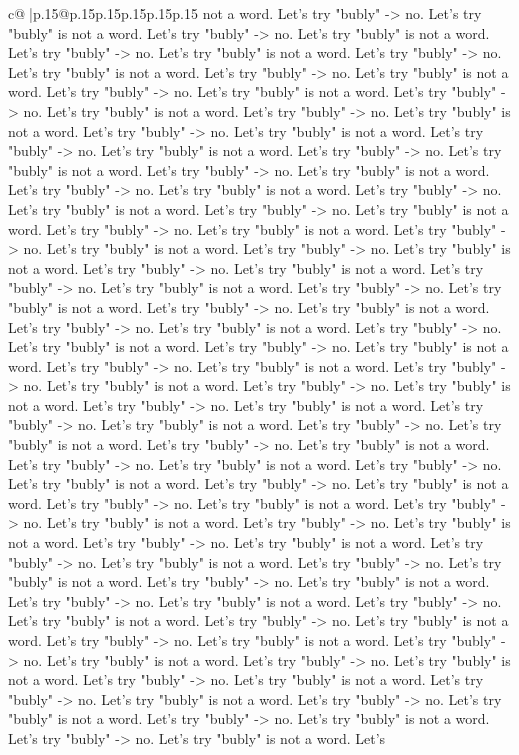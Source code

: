 \documentclass{article}
\begin{document}
{\begin{supertabular}{c@{$\;$}|p{.15\linewidth}@{}p{.15\linewidth}p{.15\linewidth}p{.15\linewidth}p{.15\linewidth}p{.15\linewidth}}
{{{not a word. Let's try "bubly" {-}> no. Let's try "bubly" is not a word. Let's try "bubly" {-}> no. Let's try "bubly" is not a word. Let's try "bubly" {-}> no. Let's try "bubly" is not a word. Let's try "bubly" {-}> no. Let's try "bubly" is not a word. Let's try "bubly" {-}> no. Let's try "bubly" is not a word. Let's try "bubly" {-}> no. Let's try "bubly" is not a word. Let's try "bubly" {-}> no. Let's try "bubly" is not a word. Let's try "bubly" {-}> no. Let's try "bubly" is not a word. Let's try "bubly" {-}> no. Let's try "bubly" is not a word. Let's try "bubly" {-}> no. Let's try "bubly" is not a word. Let's try "bubly" {-}> no. Let's try "bubly" is not a word. Let's try "bubly" {-}> no. Let's try "bubly" is not a word. Let's try "bubly" {-}> no. Let's try "bubly" is not a word. Let's try "bubly" {-}> no. Let's try "bubly" is not a word. Let's try "bubly" {-}> no. Let's try "bubly" is not a word. Let's try "bubly" {-}> no. Let's try "bubly" is not a word. Let's try "bubly" {-}> no. Let's try "bubly" is not a word. Let's try "bubly" {-}> no. Let's try "bubly" is not a word. Let's try "bubly" {-}> no. Let's try "bubly" is not a word. Let's try "bubly" {-}> no. Let's try "bubly" is not a word. Let's try "bubly" {-}> no. Let's try "bubly" is not a word. Let's try "bubly" {-}> no. Let's try "bubly" is not a word. Let's try "bubly" {-}> no. Let's try "bubly" is not a word. Let's try "bubly" {-}> no. Let's try "bubly" is not a word. Let's try "bubly" {-}> no. Let's try "bubly" is not a word. Let's try "bubly" {-}> no. Let's try "bubly" is not a word. Let's try "bubly" {-}> no. Let's try "bubly" is not a word. Let's try "bubly" {-}> no. Let's try "bubly" is not a word. Let's try "bubly" {-}> no. Let's try "bubly" is not a word. Let's try "bubly" {-}> no. Let's try "bubly" is not a word. Let's try "bubly" {-}> no. Let's try "bubly" is not a word. Let's try "bubly" {-}> no. Let's try "bubly" is not a word. Let's try "bubly" {-}> no. Let's try "bubly" is not a word. Let's try "bubly" {-}> no. Let's try "bubly" is not a word. Let's try "bubly" {-}> no. Let's try "bubly" is not a word. Let's try "bubly" {-}> no. Let's try "bubly" is not a word. Let's try "bubly" {-}> no. Let's try "bubly" is not a word. Let's try "bubly" {-}> no. Let's try "bubly" is not a word. Let's try "bubly" {-}> no. Let's try "bubly" is not a word. Let's try "bubly" {-}> no. Let's try "bubly" is not a word. Let's try "bubly" {-}> no. Let's try "bubly" is not a word. Let's try "bubly" {-}> no. Let's try "bubly" is not a word. Let's try "bubly" {-}> no. Let's try "bubly" is not a word. Let's try "bubly" {-}> no. Let's try "bubly" is not a word. Let's try "bubly" {-}> no. Let's try "bubly" is not a word. Let's try "bubly" {-}> no. Let's try "bubly" is not a word. Let's try "bubly" {-}> no. Let's try "bubly" is not a word. Let's try "bubly" {-}> no. Let's try "bubly" is not a word. Let's try "bubly" {-}> no. Let's try "bubly" is not a word. Let's try "bubly" {-}> no. Let's try "bubly" is not a word. Let's try "bubly" {-}> no. Let's try "bubly" is not a word. Let's try "bubly" {-}> no. Let's try "bubly" is not a word. Let's try "bubly" {-}> no. Let's try "bubly" is not a word. Let's }}}
\end{supertabular}}
\end{document}
